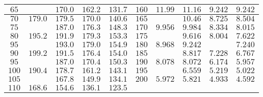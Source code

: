\begin{tabular}{|c|c|c|c|c||c|c|c|c|c|}
    \(65\)            &             & \(170.0\)    & \(162.2\)    & \(131.7\)    & \(160\)           & \(11.99\)    & \(11.16\)    & \(9.242\)    & \(9.242\)    \\ \hline 
    \(70\)            & \(179.0\)   & \(179.5\)    & \(170.0\)    & \(140.6\)    & \(165\)           &              & \(10.46\)    & \(8.725\)    & \(8.504\)    \\ \hline 
    \(75\)            &             & \(187.0\)    & \(176.3\)    & \(148.3\)    & \(170\)           & \(9.956\)    & \(9.984\)    & \(8.334\)    & \(8.015\)    \\ \hline 
    \(80\)            & \(195.2\)   & \(191.9\)    & \(179.3\)    & \(153.3\)    & \(175\)           &              & \(9.616\)    & \(8.004\)    & \(7.622\)    \\ \hline 
    \(95\)            &             & \(193.0\)    & \(179.0\)    & \(154.9\)    & \(180\)           & \(8.968\)    & \(9.242\)    &              & \(7.240\)    \\ \hline 
    \(90\)            & \(199.2\)   & \(191.5\)    & \(176.4\)    & \(154.0\)    & \(185\)           &              & \(8.817\)    & \(7.228\)    & \(6.767\)    \\ \hline 
    \(95\)            &             & \(187.0\)    & \(170.4\)    & \(150.3\)    & \(190\)           & \(8.078\)    & \(8.072\)    & \(6.174\)    & \(5.957\)    \\ \hline 
    \(100\)           & \(190.4\)   & \(178.7\)    & \(161.2\)    & \(143.1\)    & \(195\)           &              & \(6.559\)    & \(5.219\)    & \(5.022\)    \\ \hline 
    \(105\)           &             & \(167.8\)    & \(149.9\)    & \(134.1\)    & \(200\)           & \(5.972\)    & \(5.821\)    & \(4.933\)    & \(4.592\)    \\ \hline 
    \(110\)           & \(168.6\)   & \(154.6\)    & \(136.1\)    & \(123.5\)    &                   &              &              &              &              \\ \hline 
\end{tabular}
